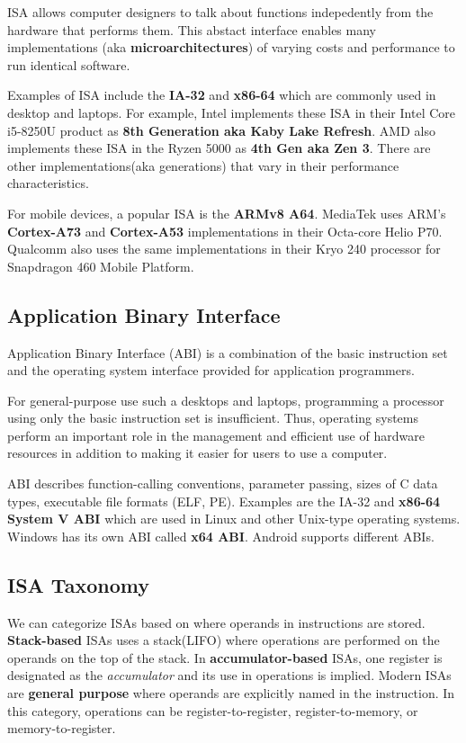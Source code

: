 \documentclass[a4paper, 11pt,oneside]{article}
\begin{document}
ISA allows computer designers to talk about functions indepedently from the 
hardware that performs them. This abstact interface enables many 
implementations (aka \textbf{microarchitectures}) of varying costs and 
performance to run identical software.

Examples of ISA include the \textbf{IA-32} and \textbf{x86-64}\cite{AMD64ISA} 
which are commonly used in desktop and laptops. For example, Intel implements 
these ISA in their Intel Core i5-8250U\cite{Corei5} product as \textbf{8th 
Generation aka Kaby Lake Refresh}\cite{KarbyLaKeR}. AMD also implements these 
ISA in the Ryzen 5000 \cite{Ryzen5000} as \textbf{4th Gen aka Zen 
3}\cite{Zen3}. There are other implementations(aka generations) that vary in 
their performance characteristics.

For mobile devices, a popular ISA is the \textbf{ARMv8 A64}\cite{ARMv8ISA}. 
MediaTek uses ARM's \textbf{Cortex-A73} and \textbf{Cortex-A53}\cite{CortexA73} 
implementations in their Octa-core Helio P70\cite{HelioP70}. Qualcomm also uses 
the same implementations in their Kryo 240 processor for Snapdragon 460 Mobile 
Platform\cite{Snapdragon460}.

\subsection{Application Binary Interface}
Application Binary Interface (ABI) is a combination of the basic instruction 
set and the operating system interface provided for application programmers. 

For general-purpose use such a desktops and laptops, programming a processor 
using only the basic instruction set is insufficient. Thus, operating systems 
perform an important role in the management and efficient use of hardware 
resources in addition to making it easier for users to use a computer. 

ABI describes function-calling conventions, parameter passing, sizes of 
C data types, executable file formats (ELF, PE). Examples are the IA-32 and 
\textbf{x86-64 System V ABI}\cite{x64ABI} which are used in Linux and other 
Unix-type 
operating systems. Windows has its own ABI called \textbf{x64 
ABI}\cite{Winx64ABI}. Android supports different ABIs\cite{AndroidABI}.


\subsection{ISA Taxonomy}
We can categorize ISAs based on where operands in instructions are stored.
\textbf{Stack-based} ISAs uses a stack(LIFO) where operations are performed on 
the operands on the top of the stack. In \textbf{accumulator-based} ISAs, one 
register is designated as the \textit{accumulator} and its use in operations is 
implied. Modern ISAs are \textbf{general purpose} where operands are explicitly 
named in the instruction. In this category, operations can be 
register-to-register, register-to-memory, or memory-to-register.
\end{document}
